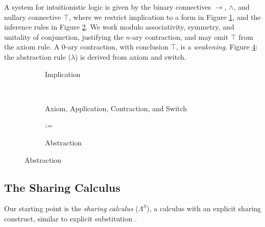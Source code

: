 \documentclass[a4paper,UKenglish,cleveref, autoref]{lipics-v2019}
\makeatletter
\newcommand{\SLC}{\Lambda^{S}}
\newcommand{\sharerule}{\triangle}
\newcommand{\apprule}{@}
\makeatother
\begin{document}
\noindent A system for intuitionistic logic is given by the binary connectives $\rightarrow$, $\wedge$, and nullary connective $\top$, where we restrict implication to a form in Figure \ref{fig:implication}, and the inference rules in Figure \ref{fig:inference}. We work modulo associativity, symmetry, and unitality of conjunction, justifying the $n$-ary contraction, and may omit $\top$ from the axiom rule. A $0$-ary contraction, with conclusion $\top$, is a \emph{weakening}. Figure \ref{fig:abstraction}: the abstraction rule ($\lambda$) is derived from axiom and switch.

\begin{figure}[h]
	\begin{subfigure}[b]{0.2\textwidth}
	\centering
		{\small {}}
	\caption{Implication}
	\label{fig:implication}
	\end{subfigure}
	\hfill
	\begin{subfigure}[b]{0.3\textwidth}
		\centering
		{\small {}} \hspace{0.2cm}
		{\small \drv{(X \rightarrow Y) \wedge X ; -[\apprule] ; Y}} \\[0.2cm]
		{\small \drv{X ; -[\sharerule] ; X \wedge \dots \wedge X}} \hspace{0.1cm}
		{\small {}}
	\caption{Axiom, Application, Contraction, and Switch}
	\label{fig:inference}
	\end{subfigure}
	\hfill
	\begin{subfigure}[b]{0.4\textwidth}
	\centering
	{\small {}} {:}{=} {\small {}}
	\caption{Abstraction}
	\label{fig:abstraction}
	\end{subfigure}
\end{figure}

\subsection{The Sharing Calculus}

Our starting point is the \emph{sharing calculus} ($\SLC$), a calculus with an explicit sharing construct, similar to explicit substitution \cite{levy1991}.
\end{document}
